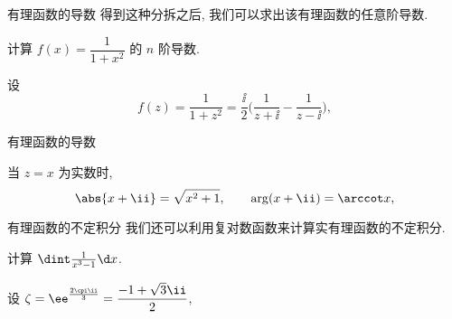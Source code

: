 \begin{frame}{有理函数的导数\noexer}
	\onslide<+->
	得到这种分拆之后, 我们可以求出该有理函数的任意阶导数.
	\onslide<+->
	\begin{example}[nearnext]
		计算 $f(x)=\dfrac1{1+x^2}$ 的 $n$ 阶导数.
	\end{example}
	\onslide<+->
	\begin{solution}[nearprev]
		设
		\[
			f(z)
			=\frac1{1+z^2}
			=\frac \ii2\biggl(\frac1{z+\ii}-\frac1{z-\ii}\biggr),
		\]
		\bigdel
	\end{solution}
\end{frame}
	
	
\begin{frame}{有理函数的导数}
	\onslide<+->
	\begin{solution}[][]%
		当 $z=x$ 为实数时,
		\[
			\abs{x+\ii}=\sqrt{x^2+1},\qquad
			\arg(x+\ii)=\arccot x,
		\]
		\onslide<+->{%
			因此
			\[
				\biggl(\frac1{1+x^2}\biggr)^{(n)}
				=(-1)^nn!(x^2+1)^{-\frac{n+1}2}\sin\bigl((n+1)\arccot x\bigr).
			\]
		}
	\end{solution}
\end{frame}


\begin{frame}{有理函数的不定积分\noexer}
	\onslide<+->
	我们还可以利用复对数函数来计算实有理函数的不定积分.
	\onslide<+->
	\begin{example}[nearnext]
		计算 $\dint \frac1{x^3-1}\d x$.
	\end{example}
	\onslide<+->
	\begin{solution}[nearprev]
		设 $\zeta=\ee^{\frac{2\cpi\ii}3}=\dfrac{-1+\sqrt3\ii}2$, 
		\bigdel
	\end{solution}
\end{frame}
	
